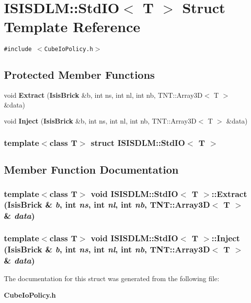 \section{ISISDLM::Std\-IO$<$ T $>$ Struct Template Reference}
\label{structISISDLM_1_1StdIO}
{\tt \#include $<$Cube\-Io\-Policy.h$>$}

\subsection*{Protected Member Functions}
\begin{CompactItemize}
\item 
void {\bf Extract} ({\bf Isis\-Brick} \&b, int ns, int nl, int nb, TNT::Array3D$<$ T $>$ \&data)
\item 
void {\bf Inject} ({\bf Isis\-Brick} \&b, int ns, int nl, int nb, TNT::Array3D$<$ T $>$ \&data)
\end{CompactItemize}
\subsubsection*{template$<$class T$>$ struct ISISDLM::Std\-IO$<$ T $>$}



\subsection{Member Function Documentation}
\subsubsection{\setlength{\rightskip}{0pt plus 5cm}template$<$class T$>$ void {\bf ISISDLM::Std\-IO}$<$ T $>$::Extract ({\bf Isis\-Brick} \& {\em b}, int {\em ns}, int {\em nl}, int {\em nb}, TNT::Array3D$<$ T $>$ \& {\em data})\hspace{0.3cm}{\tt  [inline, protected]}}\label{structISISDLM_1_1StdIO_b0}


\subsubsection{\setlength{\rightskip}{0pt plus 5cm}template$<$class T$>$ void {\bf ISISDLM::Std\-IO}$<$ T $>$::Inject ({\bf Isis\-Brick} \& {\em b}, int {\em ns}, int {\em nl}, int {\em nb}, TNT::Array3D$<$ T $>$ \& {\em data})\hspace{0.3cm}{\tt  [inline, protected]}}\label{structISISDLM_1_1StdIO_b1}




The documentation for this struct was generated from the following file:\begin{CompactItemize}
\item 
{\bf Cube\-Io\-Policy.h}\end{CompactItemize}
